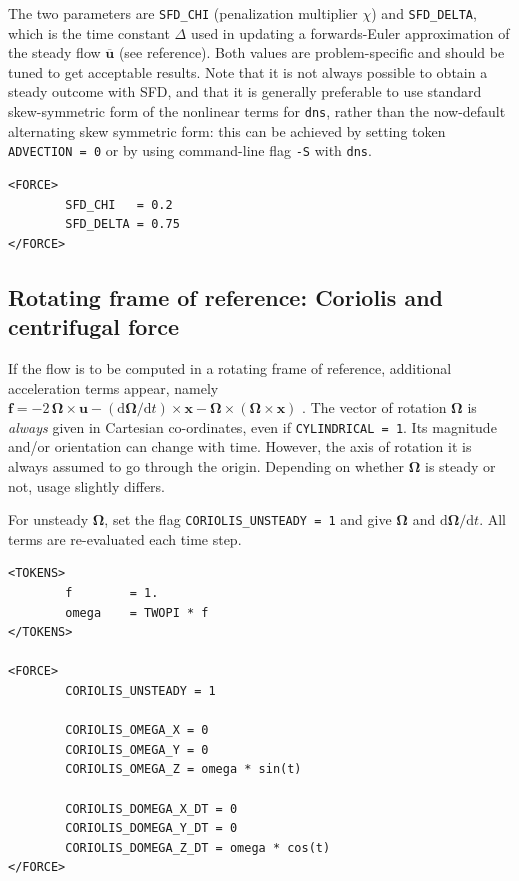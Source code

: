 \documentclass[11pt]{report}
\newcommand\cd{\mathrm{d}} \newcommand\cD{\mathrm{D}}
\begin{document}
The two parameters are \verb|SFD_CHI| (\ie penalization multiplier
$\chi$) and \verb|SFD_DELTA|, which is the time constant $\Delta$ used
in updating a forwards-Euler approximation of the steady flow
$\overline{\bm{u}}$ (see reference).  Both values are problem-specific
and should be tuned to get acceptable results.  Note that it is not
always possible to obtain a steady outcome with SFD, and that it is
generally preferable to use standard skew-symmetric form of the
nonlinear terms for \verb|dns|, rather than the now-default
alternating skew symmetric form: this can be achieved by setting token
\verb|ADVECTION = 0| or by using command-line flag \verb|-S| with
\verb|dns|.

\begin{verbatim}
<FORCE>
        SFD_CHI   = 0.2
        SFD_DELTA = 0.75
</FORCE>
\end{verbatim}

\subsection{Rotating frame of reference: Coriolis and centrifugal force}


If the flow is to be computed in a rotating frame of reference,
additional acceleration terms appear, namely $\bm{f} = -2\,\bm{\Omega}
\times \bm{u} - (\cd\bm{\Omega}/\cd t) \times \bm{x} -\bm{\Omega}
\times (\bm{\Omega} \times \bm{x})$ \citep{bat67}. The vector
of rotation $\bm{\Omega}$ is \emph{always} given in Cartesian
co-ordinates, even if \verb|CYLINDRICAL = 1|. Its magnitude and/or
orientation can change with time. However, the axis of rotation it is
always assumed to go through the origin. Depending on whether
$\bm{\Omega}$ is steady or not, usage slightly differs.


For unsteady $\bm{\Omega}$, set the flag \verb|CORIOLIS_UNSTEADY = 1|
and give $\bm{\Omega}$ and $\cd\bm{\Omega}/\cd t$. All terms are
re-evaluated each time step.
\begin{verbatim}
<TOKENS>
        f        = 1.
        omega    = TWOPI * f
</TOKENS>

<FORCE>
        CORIOLIS_UNSTEADY = 1

        CORIOLIS_OMEGA_X = 0
        CORIOLIS_OMEGA_Y = 0
        CORIOLIS_OMEGA_Z = omega * sin(t)

        CORIOLIS_DOMEGA_X_DT = 0
        CORIOLIS_DOMEGA_Y_DT = 0
        CORIOLIS_DOMEGA_Z_DT = omega * cos(t)
</FORCE>
\end{verbatim}
\end{document}
